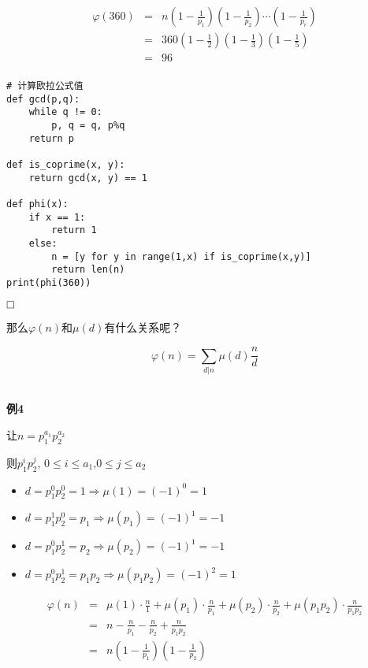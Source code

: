 \documentclass{article}
\begin{document}
\begin{eqnarray}   
\label{eq}
\varphi(360)&=& n \left(1 - \frac{1}{p_1} \right)\left(1 - \frac{1}{p_2}\right) \cdots \left(1 - \frac{1}{p_r}\right)  \nonumber \\ 
&=&  360 \left(1 - \frac{1}{2} \right)\left(1 - \frac{1}{3}\right)\left(1 - \frac{1}{5}\right) \nonumber \\ 
&=& 96 \nonumber \\ 
\nonumber 
\end{eqnarray}

\begin{lstlisting}
# 计算欧拉公式值
def gcd(p,q):
    while q != 0:
        p, q = q, p%q
    return p

def is_coprime(x, y):
    return gcd(x, y) == 1

def phi(x):
    if x == 1:
        return 1
    else:
        n = [y for y in range(1,x) if is_coprime(x,y)]
        return len(n)
print(phi(360))
\end{lstlisting}
$\hfill\square$ 

那么$\varphi(n)$和$\mu(d)$有什么关系呢？

$$\varphi(n) = \sum_{d|n}\mu(d)\frac{n}{d}$$

~\\

\textbf{例4}

让$n = p_1^{a_1}p_2^{a_2}$

则$p_1^{i}p_2^{j}$, $0 \leq i \leq a_1$,$0 \leq j \leq a_2$

\begin{itemize}
\item $ d =  p_1^{0}p_2^{0} = 1\Rightarrow	\mu(1) = (-1)^0 = 1$
\item $ d =  p_1^{1}p_2^{0} = p_1\Rightarrow	\mu(p_1) = (-1)^1 = -1$
\item $ d =  p_1^{0}p_2^{1} = p_2\Rightarrow	\mu(p_2) = (-1)^1 = -1$
\item $ d =  p_1^{0}p_2^{1} = p_1p_2\Rightarrow	\mu(p_1p_2) = (-1)^2 = 1$
\end{itemize}

\begin{eqnarray}   
\label{eq}
\varphi(n)&=&  \mu(1) \cdot \frac{n}{1} + \mu(p_1) \cdot \frac{n}{p_1}+ \mu(p_2) \cdot \frac{n}{p_2}+ \mu(p_1p_2) \cdot \frac{n}{p_1p_2}\nonumber \\ 
&=&  n - \frac{n}{p_1} - \frac{n}{p_2} + \frac{n}{p_1p_2} \nonumber \\ 
&=& n\left(1- \frac{1}{p_1}\right)\left(1- \frac{1}{p_2}\right) \nonumber \\ 
\nonumber 
\end{eqnarray}
\end{document}

